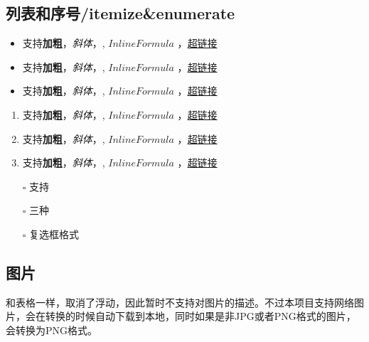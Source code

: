 \documentclass{article}
\begin{document}
\subsection{列表和序号/itemize\&enumerate}


\begin{itemize}
\item
支持\textbf{加粗}，\textit{斜体}，, $Inline Formula$ ，\href{http:///www.github.com}{超链接}
\item
支持\textbf{加粗}，\textit{斜体}，, $Inline Formula$ ，\href{http:///www.github.com}{超链接}
\item
支持\textbf{加粗}，\textit{斜体}，, $Inline Formula$ ，\href{http:///www.github.com}{超链接}
\end{itemize}



\begin{enumerate}
\item
支持\textbf{加粗}，\textit{斜体}，, $Inline Formula$ ，\href{http:///www.github.com}{超链接}
\item
支持\textbf{加粗}，\textit{斜体}，, $Inline Formula$ ，\href{http:///www.github.com}{超链接}
\item
支持\textbf{加粗}，\textit{斜体}，, $Inline Formula$ ，\href{http:///www.github.com}{超链接}
\end{enumerate}



\begin{itemize}
\item[\rlap{\raisebox{0.3ex}{\hspace{0.4ex}\tiny \ding{52}}}$\square$]
支持
\item[\rlap{\raisebox{0.3ex}{\hspace{0.4ex}\scriptsize \ding{56}}}$\square$]
三种
\item[$\square$]
复选框格式
\end{itemize}



\subsection{图片}


和表格一样，取消了浮动，因此暂时不支持对图片的描述。不过本项目支持网络图片，会在转换的时候自动下载到本地，同时如果是非JPG或者PNG格式的图片，会转换为PNG格式。
\end{document}

